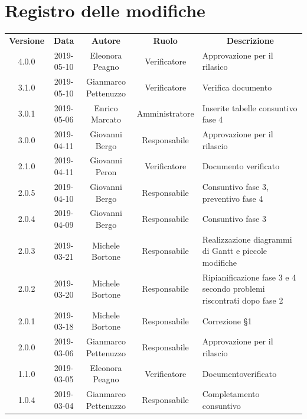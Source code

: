 \documentclass[11pt,a4paper]{article}
\begin{document}
	
	{\def\arraystretch{2}\tabcolsep=10pt
	\newpage
	\section*{\centering Registro delle modifiche}
	\begin{tabularx}{\textwidth}{ c | c | c | c | X }
		\rowcolor{LightBlue}
		\color{white}\bfseries Versione & 
		\color{white}\bfseries Data & 
		\color{white}\bfseries Autore & 
		\color{white}\bfseries Ruolo & 
		\multicolumn{1}{c}{\color{white}\bfseries Descrizione}\\[0.25cm]
		4.0.0 & 2019-05-10 & Eleonora Peagno & Verificatore & Approvazione per il rilasico \\ \hline
		3.1.0 & 2019-05-10 & Gianmarco Pettenuzzo & Verificatore & Verifica documento \\ \hline
		3.0.1 & 2019-05-06 & Enrico Marcato & Amministratore & Inserite tabelle consuntivo fase 4 \\ \hline
		3.0.0 & 2019-04-11 & Giovanni Bergo & Responsabile & Approvazione per il rilascio\\ \hline
		2.1.0 & 2019-04-11 & Giovanni Peron & Verificatore &	Documento \newline verificato\\ \hline
		2.0.5 & 2019-04-10 & Giovanni Bergo & Responsabile &	Consuntivo fase 3, preventivo fase 4\\ \hline
		2.0.4 & 2019-04-09 & Giovanni Bergo & Responsabile & Consuntivo fase 3\\ \hline
		2.0.3 & 2019-03-21 & Michele Bortone & Responsabile & Realizzazione diagrammi di Gantt e piccole modifiche\\ \hline
		2.0.2 & 2019-03-20 & Michele Bortone & Responsabile & Ripianificazione fase 3 e 4 secondo problemi riscontrati dopo fase 2\\ \hline
		2.0.1 & 2019-03-18 & Michele Bortone & Responsabile & Correzione §1\\ \hline
		2.0.0 & 2019-03-06 & Gianmarco Pettenuzzo & Responsabile & Approvazione per il rilascio\\ \hline
		1.1.0 & 2019-03-05 & Eleonora Peagno & Verificatore & Documento\newline verificato\\ \hline
		1.0.4 & 2019-03-04 & Gianmarco Pettenuzzo & Responsabile & Completamento \newline consuntivo\\ \hline

\end{tabularx}}
\end{document}
